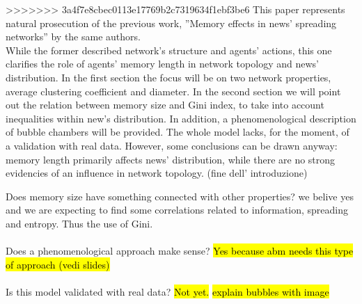 >>>>>>> 3a4f7e8cbec0113e17769b2c7319634f1ebf3be6
This paper represents natural prosecution of the previous work,
''Memory effects in news' spreading networks'' by the same authors.\\
While the former described network's structure and agents' actions, this one clarifies the role of agents' memory length in network topology and news' distribution.
In the first section the focus will be on two network properties, average clustering coefficient and diameter.
In the second section we will point out the relation between memory size
and Gini index, to take into account inequalities within new's distribution. 
In addition, a phenomenological description of bubble chambers will be provided.
The whole model lacks, for the moment, of a validation with real data.
However, some conclusions can be drawn anyway: memory length primarily affects news' distribution, while there are no strong evidencies of an influence in network topology.
(fine dell' introduzione)


Does memory size have something connected with other properties?
we belive yes and we are expecting to find some correlations related
to information, spreading and entropy. Thus the use of Gini.\\ \\
Does a phenomenological approach make sense? \hl{Yes because abm needs
this type of approach (vedi slides)}\\ \\
Is this model validated with real data? \hl{Not yet.}
\hl{explain bubbles with image}